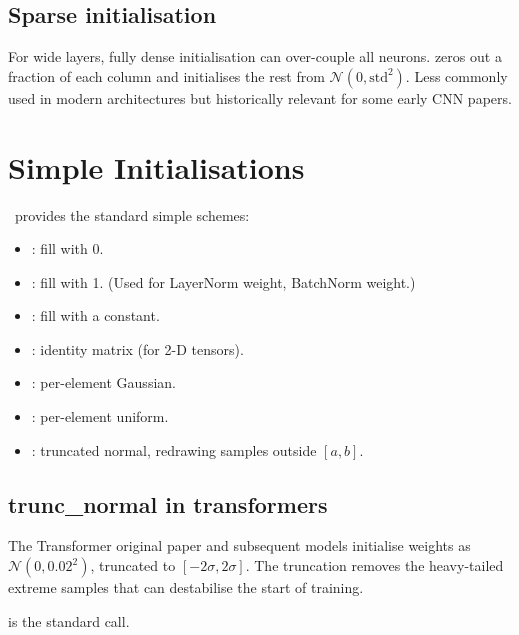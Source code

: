 \subsection{Sparse initialisation}
\label{ssec:initialization:sparse_init}

For wide layers, fully dense initialisation can over-couple all
neurons. 
zeros out a fraction  of each column and
initialises the rest from $\mathcal{N}(0, \mathrm{std}^2)$.
Less commonly used in modern architectures but historically
relevant for some early CNN papers.

\section{Simple Initialisations}
\label{sec:initialization:simple}

\Lucid\ provides the standard simple schemes:

\begin{itemize}
  \item {}: fill with 0.
  \item {}: fill with 1. (Used for LayerNorm
    weight, BatchNorm weight.)
  \item {}: fill with a constant.
  \item {}: identity matrix (for 2-D tensors).
  \item {}: per-element
    Gaussian.
  \item {}: per-element uniform.
  \item {}: truncated
    normal, redrawing samples outside $[a, b]$.
\end{itemize}

\subsection{trunc\_normal in transformers}
\label{ssec:initialization:trunc_normal}

The Transformer original paper \cite{vaswani_attention_2017}
and subsequent models initialise weights as
$\mathcal{N}(0, 0.02^2)$, truncated to $[-2 \sigma, 2 \sigma]$.
The truncation removes the heavy-tailed extreme samples that can
destabilise the start of training.

is the standard call.

